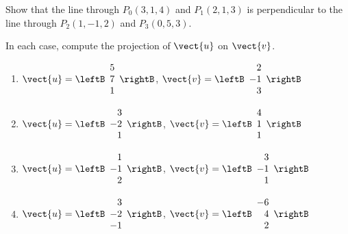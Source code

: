 \begin{multicols}{2}
\begin{ex}
\begin{sol}
\begin{enumerate}[label={\alph*.}]
\end{enumerate}
\end{sol}
\end{ex}

\begin{ex}
Show that the line through $P_{0}(3, 1, 4)$ and $P_{1}(2, 1, 3)$ is perpendicular to the line through $P_{2}(1, -1, 2)$ and $P_{3}(0, 5, 3)$.
\end{ex}

\begin{ex}
In each case, compute the projection of $\vect{u}$ on $\vect{v}$.


\begin{enumerate}[label={\alph*.}]
\item $\vect{u} = \leftB
\begin{array}{r}
5\\
7\\
1
\end{array}
\rightB$, 
$\vect{v} = \leftB
\begin{array}{r}
2\\
-1\\
3
\end{array}
\rightB
$

\item $\vect{u} = \leftB
\begin{array}{r}
3\\
-2\\
1
\end{array}
\rightB$, 
$\vect{v} = \leftB
\begin{array}{r}
4\\
1\\
1
\end{array}
\rightB
$

\item $\vect{u} = \leftB
\begin{array}{r}
1\\
-1\\
2
\end{array}
\rightB$, 
$\vect{v} = \leftB
\begin{array}{r}
3\\
-1\\
1
\end{array}
\rightB
$

\item $\vect{u} = \leftB
\begin{array}{r}
3\\
-2\\
-1
\end{array}
\rightB$, 
$\vect{v} = \leftB
\begin{array}{r}
-6\\
4\\
2
\end{array}
\rightB
$


\end{enumerate}
\end{ex}
\end{multicols}
